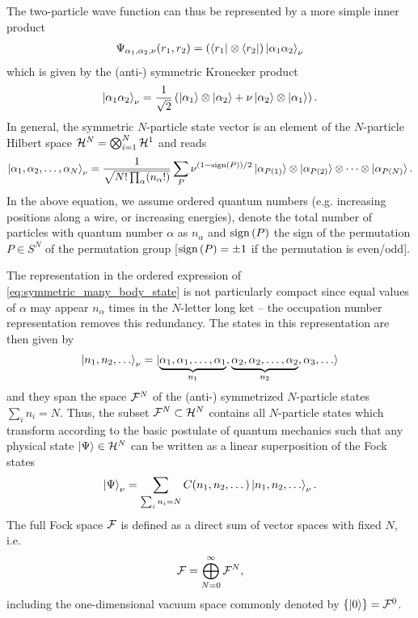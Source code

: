 The two-particle wave function can thus be represented by a more simple inner product
\begin{align}
    \Psi_{\alpha_1,\alpha_2,\nu}(r_1,r_2) = \left(\bra{r_1}\otimes\bra{r_2}\right)\ket{\alpha_1 \alpha_2}_\nu
\end{align}
which is given by the (anti-) symmetric Kronecker product
\begin{align}
    \ket{\alpha_1 \alpha_2}_\nu = \frac1{\sqrt2}\left(\ket{\alpha_1}\otimes\ket{\alpha_2} + \nu\ket{\alpha_2}\otimes\ket{\alpha_1}\right).
\end{align}
In general, the symmetric $N$-particle state vector is an element of the $N$-particle Hilbert space $\mathcal{H}^N = \bigotimes_{i=1}^N\mathcal{H}^1$ and reads
\begin{align}
    \ket{\alpha_1,\alpha_2,\dots,\alpha_N}_\nu = \frac1{\sqrt{N!\prod_{\alpha}(n_\alpha!)}}\sum_P \nu^{(1-\text{sign}\left( P \right))/2}\ket{\alpha_{P(1)}}\otimes\ket{\alpha_{P(2)}}\otimes\dots\otimes\ket{\alpha_{P(N)}}.
    \label{eq:symmetric_many_body_state}
\end{align}
In the above equation, we assume ordered quantum numbers (e.g. increasing positions along a wire, or increasing energies), denote the total number of particles with quantum number $\alpha$ as $n_\alpha$ and $\text{sign}\left( P \right)$ the sign of the permutation $P\in S^N$ of the permutation group [$\text{sign}\left( P \right)=\pm1$ if the permutation is even/odd].

The representation in the ordered expression of \cref{eq:symmetric_many_body_state} is not particularly compact since equal values of $\alpha$ may appear $n_\alpha$ times in the $N$-letter long ket -- the occupation number representation removes this redundancy.
The states in this representation are then given by
\begin{align}
    \ket{n_1, n_2, \dots}_\nu = \ket{\underbrace{\alpha_1,\alpha_1,\dots,\alpha_1}_{n_1}, \underbrace{\alpha_2, \alpha_2,\dots, \alpha_2}_{n_2}, \alpha_3, \dots}
\end{align}
and they span the space $\mathcal{F}^N$ of the (anti-) symmetrized $N$-particle states $\sum_{i} n_i = N$.
Thus, the subset $\mathcal{F}^N\subset \mathcal{H}^N$ contains all $N$-particle states which transform according to the basic postulate of quantum mechanics such that any physical state $\ket{\Psi}\in\mathcal{H}^N$ can be written as a linear superposition of the Fock states
\begin{align}
    \ket{\Psi}_\nu = \sum_{\sum_i n_i = N}C(n_1,n_2,\dots)\ket{n_1,n_2,\dots}_\nu.
\end{align}
The full Fock space $\mathcal{F}$ is defined as a direct sum of vector spaces with fixed $N$, i.e.
\begin{align}
    \mathcal{F} = \bigoplus_{N=0}^\infty \mathcal{F}^N,
\end{align}
including the one-dimensional vacuum space commonly denoted by $\{\ket{0}\}=\mathcal{F}^0$.


